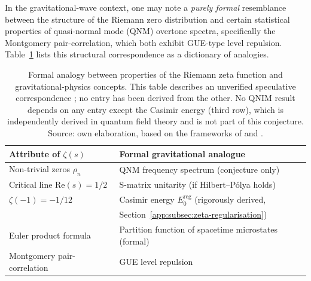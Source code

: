 \documentclass[11pt,a4paper, english]{book}
\theoremstyle{plain}
\theoremstyle{definition}
\numberwithin{equation}{chapter}
\numberwithin{figure}{chapter}
\numberwithin{table}{chapter}
\begin{document}
In the gravitational-wave context, one may note a \emph{purely formal}
resemblance between the structure of the Riemann zero distribution and
certain statistical properties of quasi-normal mode (QNM) overtone
spectra, specifically the Montgomery pair-correlation, which both
exhibit GUE-type level repulsion.  Table~\ref{tab:zeta_gravity}
lists this structural correspondence as a dictionary of analogies.


\begin{table}
\centering
\begin{tabular}{@{}ll@{}}
\toprule
\textbf{Attribute of $\zeta(s)$} & \textbf{Formal gravitational analogue} \\
\midrule
Non-trivial zeros $\rho_n$ & QNM frequency spectrum (conjecture only) \\
Critical line $\mathrm{Re}(s) = 1/2$ & S-matrix unitarity (if Hilbert--P\'olya holds) \\
$\zeta(-1) = -1/12$ & Casimir energy $E_0^\mathrm{reg}$ (rigorously derived, \\
                    & \quad Section~\ref{app:subsec:zeta-regularisation}) \\
Euler product formula & Partition function of spacetime microstates (formal) \\
Montgomery pair-correlation & GUE level repulsion \\
\bottomrule
\end{tabular}
\caption[Analogy between zeta function and gravitational concepts]{Formal analogy between properties of the Riemann zeta function
         and gravitational-physics concepts. This table describes an unverified speculative
         correspondence \protect\cite{Berry_Keating_1999,Connes_1999};
         no entry has been derived from the other.
         No QNIM result depends on any entry except the Casimir
         energy (third row), which is independently derived in
         quantum field theory and is not part of this conjecture. Source: own elaboration, based on the frameworks of \cite{Berry_Keating_1999} and \cite{Connes_1999}.}
\label{tab:zeta_gravity}
\vspace{2pt}
\normalsize

\end{table}
\end{document}
